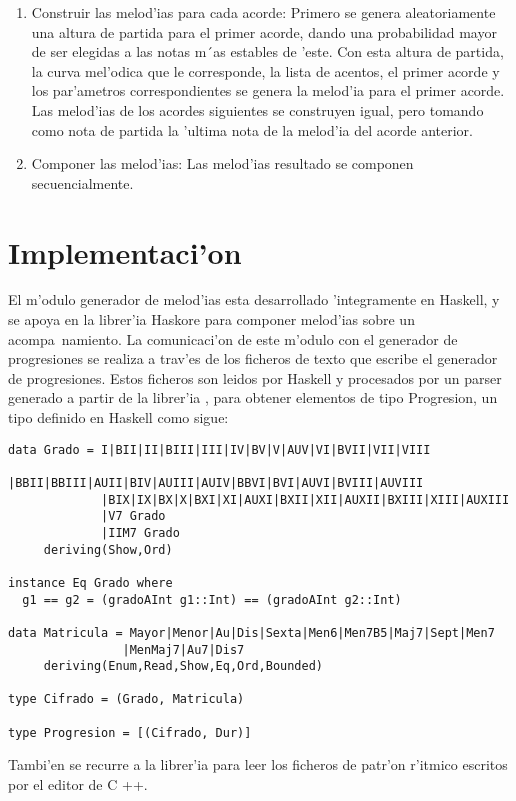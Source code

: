 ﻿\documentclass[a4paper,12pt]{article}
\begin{document}
\begin{enumerate}
	\item Construir las melod'ias para cada acorde: Primero se genera aleatoriamente una altura de partida para el primer acorde, dando una probabilidad mayor de ser elegidas a las notas m´as estables de 'este. Con esta altura de partida, la curva mel'odica que le corresponde, la lista de acentos, el primer acorde y los par'ametros correspondientes se genera la melod'ia para el primer acorde. Las melod'ias de los acordes siguientes se construyen igual, pero tomando como nota de partida la 'ultima nota de la melod'ia del acorde anterior.
	\item Componer las melod'ias: Las melod'ias resultado se componen secuencialmente.
        \end{enumerate}


\section{Implementaci'on}
El m'odulo generador de melod'ias esta desarrollado 'integramente en Haskell, y se apoya en la librer'ia Haskore \cite{hudak} para componer melod'ias sobre un acompa~namiento.
\newline
La comunicaci'on de este m'odulo con el generador de progresiones se realiza a trav'es de los ficheros de texto que escribe el generador de progresiones. Estos ficheros son leidos por Haskell y procesados por un parser generado a partir de la librer'ia \cite{fokker}, para obtener elementos de tipo Progresion, un tipo definido en Haskell como sigue:
        \begin{verbatim}
data Grado = I|BII|II|BIII|III|IV|BV|V|AUV|VI|BVII|VII|VIII
             |BBII|BBIII|AUII|BIV|AUIII|AUIV|BBVI|BVI|AUVI|BVIII|AUVIII
             |BIX|IX|BX|X|BXI|XI|AUXI|BXII|XII|AUXII|BXIII|XIII|AUXIII
             |V7 Grado
             |IIM7 Grado
     deriving(Show,Ord)

instance Eq Grado where
  g1 == g2 = (gradoAInt g1::Int) == (gradoAInt g2::Int)

data Matricula = Mayor|Menor|Au|Dis|Sexta|Men6|Men7B5|Maj7|Sept|Men7
                |MenMaj7|Au7|Dis7
     deriving(Enum,Read,Show,Eq,Ord,Bounded)

type Cifrado = (Grado, Matricula)

type Progresion = [(Cifrado, Dur)]
        \end{verbatim}
Tambi'en se recurre a la librer'ia \cite{fokker} para leer los ficheros de patr'on r'itmico escritos por el editor de C ++.
\newline
\end{document}
